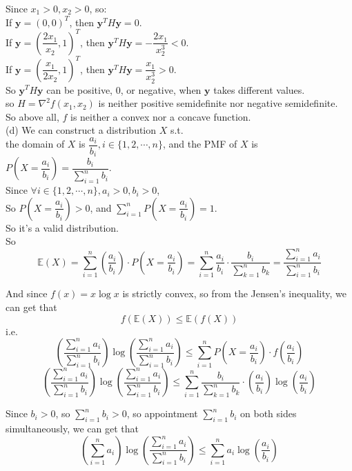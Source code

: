 \documentclass[10pt]{article}
\begin{document}
\begin{enumerate}[1.]
		  Since $x_1>0,x_2>0$, so:\\
		  If $\mathbf{y}=(0,0)^T$, then $\mathbf{y}^TH\mathbf{y}=0$.\\
		  If $\mathbf{y}=(\dfrac{2x_1}{x_2},1)^T$, then $\mathbf{y}^TH\mathbf{y}=-\dfrac{2x_1}{x_2^3}<0$.\\
		  If $\mathbf{y}=(\dfrac{x_1}{2x_2},1)^T$, then $\mathbf{y}^TH\mathbf{y}=\dfrac{x_1}{x_2^3}>0$.\\

		  So $\mathbf{y}^TH\mathbf{y}$ can be positive, $0$, or negative, when $\mathbf{y}$ takes different values.\\ 
		  so $H=\nabla^2f(x_1,x_2)$ is neither positive semidefinite nor negative semidefinite.\\
		
		  So above all, $f$ is neither a convex nor a concave function.\\

		  (d) We can construct a distribution $X$ s.t.\\
		  the domain of $X$ is $\dfrac{a_i}{b_i}, i\in\{1,2,\cdots,n\}$, and the PMF of $X$ is $P(X=\dfrac{a_i}{b_i})=\dfrac{b_i}{\sum\limits_{i=1}^{n}b_i}$.\\
		  Since $\forall i \in\{1,2,\cdots,n\}, a_i > 0, b_i > 0$,\\
		  So $P(X=\dfrac{a_i}{b_i}) > 0$, and $\sum\limits_{i=1}^{n}P(X=\dfrac{a_i}{b_i})=1$.\\
		  So it's a valid distribution.\\
		  So $$\mathbb{E}(X)=\sum\limits_{i=1}^{n} (\dfrac{a_i}{b_i})\cdot P(X=\dfrac{a_i}{b_i})=\sum\limits_{i=1}^{n} \dfrac{a_i}{b_i}\cdot \dfrac{b_i}{\sum\limits_{k=1}^{n}b_k}=\dfrac{\sum\limits_{i=1}^{n}a_i}{\sum\limits_{i=1}^{n}b_i}$$

		  And since $f(x)=x\log x$ is strictly convex, so from the Jensen's inequality, we can get that\\
		  $$f(\mathbb{E}(X)) \leq \mathbb{E}(f(X))$$
		  i.e.
		  $$\left(\dfrac{\sum\limits_{i=1}^{n}a_i}{\sum\limits_{i=1}^{n}b_i}\right)\log \left(\dfrac{\sum\limits_{i=1}^{n}a_i}{\sum\limits_{i=1}^{n}b_i}\right) 
		  \leq \sum\limits_{i=1}^{n} P(X=\dfrac{a_i}{b_i})\cdot f(\dfrac{a_i}{b_i})$$
		  $$\left(\dfrac{\sum\limits_{i=1}^{n}a_i}{\sum\limits_{i=1}^{n}b_i}\right)\log \left(\dfrac{\sum\limits_{i=1}^{n}a_i}{\sum\limits_{i=1}^{n}b_i}\right)
		  \leq \sum\limits_{i=1}^{n} \dfrac{b_i}{\sum\limits_{k=1}^nb_k}\cdot(\dfrac{a_i}{b_i})\log(\dfrac{a_i}{b_i})$$
		  
		  Since $b_i>0$, so $\sum\limits_{i=1}^nb_i>0$, so appointment $\sum\limits_{i=1}^nb_i$ on both sides simultaneously, we can get that
		  $$\left(\sum\limits_{i=1}^{n} a_i\right) \log \left(\dfrac{\sum\limits_{i=1}^{n} a_i}{\sum\limits_{i=1}^{n} b_i}\right)
		  \leq \sum\limits_{i=1}^{n} a_i\log \left(\dfrac{a_i}{b_i}\right)$$
		  

\end{enumerate}
\end{document}
